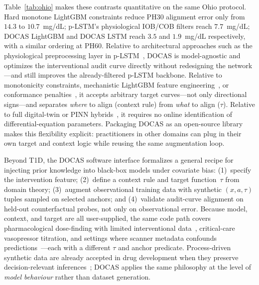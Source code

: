 \documentclass[a4paper,fleqn]{cas-sc}
\begin{document}
Table~\ref{tab:ohio} makes these contrasts quantitative on the same Ohio
protocol. Hard monotone LightGBM constraints reduce PH30 alignment error only
from $14.3$ to $10.7$~mg/dL; p-LSTM's physiological IOB/COB filters reach
$7.7$~mg/dL; DOCAS LightGBM and DOCAS LSTM reach $3.5$ and $1.9$~mg/dL
respectively, with a similar ordering at PH60. Relative to architectural
approaches such as the physiological preprocessing layer in
p-LSTM~\citep{prendin2023,zecchin2012,mirshekarian2017}, DOCAS is
model-agnostic and optimizes the interventional audit curve directly without
redesigning the network---and still improves the already-filtered p-LSTM
backbone. Relative to monotonicity constraints,
mechanistic LightGBM feature engineering~\citep{wolber2025multimodal}, or
conformance penalties~\citep{kushner2020,ke2017}, it accepts arbitrary target
curves---not only directional signs---and separates \emph{where} to align
(context rule) from \emph{what} to align ($\tau$). Relative to
full digital-twin or PINN hybrids~\citep{cappon2023,dallaman2007}, it requires
no online identification of differential-equation parameters. Packaging DOCAS
as an open-source library makes this flexibility explicit: practitioners in
other domains can plug in their own target and context logic while reusing the
same augmentation loop.

Beyond T1D, the DOCAS software interface formalizes a general recipe for
injecting prior knowledge into black-box models under covariate bias:
(1)~specify the intervention feature; (2)~define a context rule and target
function~$\tau$ from domain theory; (3)~augment observational training data
with synthetic $(x,a,\tau)$ tuples sampled on selected anchors; and
(4)~validate audit-curve alignment on held-out counterfactual probes, not only
on observational error. Because model, context, and target are all
user-supplied, the same code path covers pharmacological dose-finding with
limited interventional data~\citep{scholkopf2021}, critical-care vasopressor
titration, and settings where scanner metadata confounds
predictions~\citep{zech2018,degris2024}---each with a different $\tau$ and
anchor predicate. Process-driven synthetic data are already accepted in drug
development when they preserve decision-relevant
inferences~\citep{cobelli2009}; DOCAS applies the same philosophy at the
level of \emph{model behaviour} rather than dataset generation.
\end{document}

